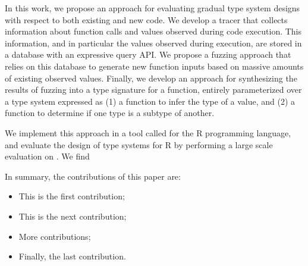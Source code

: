 In this work, we propose an approach for evaluating gradual type system designs with respect to both existing and new code.
We develop a tracer that collects information about function calls and values observed during code execution.
This information, and in particular the values observed during execution, are stored in a database with an expressive query API.
We propose a fuzzing approach that relies on this database to generate new function inputs based on massive amounts of existing observed values.
Finally, we develop an approach for synthesizing the results of fuzzing into a type signature for a function, entirely parameterized over a type system expressed as (1) a function to infer the type of a value, and (2) a function to determine if one type is a subtype of another.

We implement this approach in a tool called \tool for the R programming language, and evaluate the design of  type systems for R by performing a large scale evaluation on .
We find \AT{\ldots}

In summary, the contributions of this paper are:

\begin{itemize}
    \item This is the first contribution;
    \item This is the next contribution;
    \item More contributions;
    \item Finally, the last contribution.
\end{itemize}



